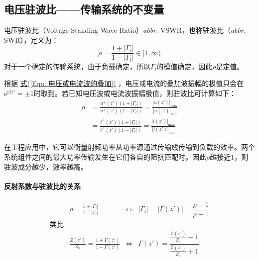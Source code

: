 \subsection{电压驻波比——传输系统的不变量}
    电压驻波比（Voltage Standing Wave Ratio）\emph{abbr.} VSWR，也称驻波比（\emph{abbr.} SWR），定义为：
    \begin{equation}
        \rho=\frac{1+\left\vert\varGamma_l\right\vert}{1-\left\vert\varGamma_l\right\vert}\in[1,\infty)
    \end{equation}
    对于一个确定的传输系统，由于负载确定，所以$\varGamma_l$的模值确定，因此$\rho$是定值。


    根据 \hyperref[Equ: 电压或电流波的叠加]{式(\ref*{Equ: 电压或电流波的叠加})} ，电压或电流的叠加波振幅的极值只会在$\mathrm{e}^{\mathrm{j}\beta z'}=\pm 1$时取到。若已知电压波或电流波振幅极值，则驻波比可计算如下：
    \begin{align}
        \rho
        &=\frac{u^+(z')(1+|\varGamma_l|)}{u^+(z')(1-|\varGamma_l|)}
        =\frac{|u(z')|_\mathrm{max}}{|u(z')|_\mathrm{min}}\\
        &=\frac{i^+(z')(1+|\varGamma_l|)}{i^+(z')(1-|\varGamma_l|)}
        =\frac{|i(z')|_\mathrm{max}}{|i(z')|_\mathrm{min}}
    \end{align}

    在工程应用中，它可以衡量射频功率从功率源通过传输线传输到负载的效率。两个系统组件之间的最大功率传输发生在它们各自的阻抗匹配时。因此$\rho$越接近$1$，则驻波成分越少，效率越高。

    \paragraph{反射系数与驻波比的关系}
    \begin{equation*}
        \begin{array}{cccc}
            ~&\rho=\frac{1+\left\vert\varGamma_l\right\vert}{1-\left\vert\varGamma_l\right\vert}
            &\Leftrightarrow
            &|\varGamma_l|=|\varGamma(z')|=\dfrac{\rho-1}{\rho+1}\\
            \mbox{类比}&~&~&~\\
            ~&\frac{Z(z')}{Z_0}=\frac{1+\varGamma(z')}{1-\varGamma(z')}
            &\Leftrightarrow
            &\varGamma(z')=\dfrac{\frac{Z(z')}{Z_0}-1}{\frac{Z(z')}{Z_0}+1}
        \end{array}
    \end{equation*}

